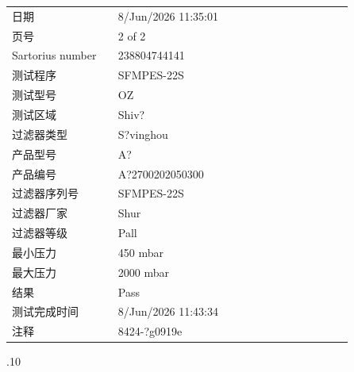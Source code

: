 \documentclass[UTF8,10pt,a4paper,fontset=fandol]{ctexart}
\newcommand{\fieldvalue}[1]{#1}
\newcommand{\handwritten}[1]{#1}
\begin{document}
\begin{tabular}{@{}p{0.28\linewidth}p{0.62\linewidth}@{}}
日期 &
\fieldvalue{8/Jun/2026 11:35:01}
\\[2pt]
页号 &
\fieldvalue{2 of 2}
\\[2pt]
Sartorius number &
\fieldvalue{238804744141}
\\[2pt]
测试程序 &
\fieldvalue{SFMPES-22S}
\\[2pt]
测试型号 &
\fieldvalue{OZ}
\\[2pt]
测试区域 &
\fieldvalue{Shiv?}
\\[2pt]
过滤器类型 &
\fieldvalue{S?vinghou}
\\[2pt]
产品型号 &
\fieldvalue{A?}
\\[2pt]
产品编号 &
\fieldvalue{A?2700202050300}
\\[2pt]
过滤器序列号 &
\fieldvalue{SFMPES-22S}
\\[2pt]
过滤器厂家 &
\fieldvalue{Shur}
\\[2pt]
过滤器等级 &
\fieldvalue{Pall}
\\[2pt]
最小压力 &
\fieldvalue{450 mbar}
\\[2pt]
最大压力 &
\fieldvalue{2000 mbar}
\\[2pt]
结果 &
\fieldvalue{Pass}
\\[2pt]
测试完成时间 &
\fieldvalue{8/Jun/2026 11:43:34}
\\[2pt]
注释 &
\fieldvalue{8424-?g0919e}
\\
\end{tabular}

\noindent
\handwritten{2026.06.10}
\end{document}
